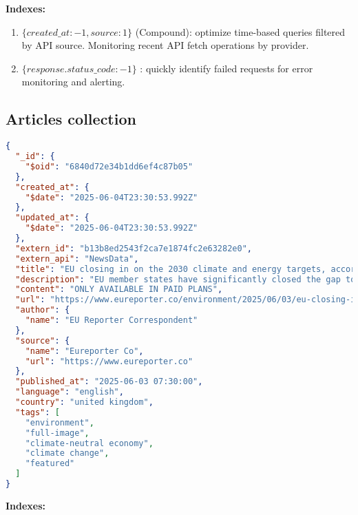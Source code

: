\textbf{Indexes:}

\begin{enumerate}
  \item $\{ created\_at: -1, source: 1 \}$ (Compound): optimize time-based queries filtered by API source.
    Monitoring recent API fetch operations by provider.
  \item $\{ response.status\_code: -1 \}$ : quickly identify failed requests for error monitoring and alerting.
\end{enumerate}


\subsection{Articles collection}\label{subsec:articles-collection}


\begin{lstlisting}[language=json,label={lst:articles-collection-json-example}]
{
  "_id": {
    "$oid": "6840d72e34b1dd6ef4c87b05"
  },
  "created_at": {
    "$date": "2025-06-04T23:30:53.992Z"
  },
  "updated_at": {
    "$date": "2025-06-04T23:30:53.992Z"
  },
  "extern_id": "b13b8ed2543f2ca7e1874fc2e63282e0",
  "extern_api": "NewsData",
  "title": "EU closing in on the 2030 climate and energy targets, according to national plans",
  "description": "EU member states have significantly closed the gap to achieving the 2030 energy and climate targets, according to the European Commission's assessment of the National Energy and Climate Plans (NECPs). EU countries have substantially improved their plans following Commission recommendations in December 2023. As a result, the EU is closing in collectively on a 55% reduction in greenhouse gas (GHG) emissions, as committed [...]",
  "content": "ONLY AVAILABLE IN PAID PLANS",
  "url": "https://www.eureporter.co/environment/2025/06/03/eu-closing-in-on-the-2030-climate-and-energy-targets-according-to-national-plans/",
  "author": {
    "name": "EU Reporter Correspondent"
  },
  "source": {
    "name": "Eureporter Co",
    "url": "https://www.eureporter.co"
  },
  "published_at": "2025-06-03 07:30:00",
  "language": "english",
  "country": "united kingdom",
  "tags": [
    "environment",
    "full-image",
    "climate-neutral economy",
    "climate change",
    "featured"
  ]
}
\end{lstlisting}

\textbf{Indexes:}

